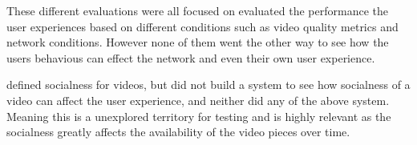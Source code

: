 These different evaluations were all focused on evaluated the performance the user experiences based on different conditions such as video quality metrics and network conditions. However none of them went the other way to see how the users behavious can effect the network and even their own user experience.

\citeauthor{broxton2013catching} \cite{broxton2013catching} defined socialness for videos, but did not build a system to see how socialness of a video can affect the user experience, and neither did any of the above system. Meaning this is a unexplored territory for testing and is highly relevant as the socialness greatly affects the availability of the video pieces over time.


